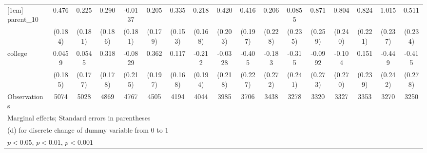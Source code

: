 {\begin{tabular}{l*{16}{c}}
[1em]
parent\_10           &       0.476\sym{**} &       0.225         &       0.290         &     -0.0137         &       0.205         &       0.335\sym{*}  &       0.218         &       0.420\sym{*}  &       0.416\sym{*}  &       0.206         &      0.0855         &       0.871\sym{***}&       0.804\sym{***}&       0.824\sym{***}&       1.015\sym{***}&       0.511\sym{*}  \\
                    &     (0.184)         &     (0.181)         &     (0.186)         &     (0.181)         &     (0.179)         &     (0.153)         &     (0.168)         &     (0.203)         &     (0.197)         &     (0.228)         &     (0.235)         &     (0.259)         &     (0.240)         &     (0.221)         &     (0.237)         &     (0.234)         \\
[1em]
college             &      0.0459         &      0.0545         &       0.318         &     -0.0829         &       0.362         &       0.117         &      -0.212         &     -0.0328         &      -0.405         &      -0.183         &      -0.315         &     -0.0992         &      -0.104         &       0.151         &      -0.449         &      -0.415         \\
                    &     (0.185)         &     (0.177)         &     (0.178)         &     (0.215)         &     (0.197)         &     (0.168)         &     (0.194)         &     (0.218)         &     (0.227)         &     (0.272)         &     (0.241)         &     (0.273)         &     (0.270)         &     (0.239)         &     (0.242)         &     (0.278)         \\
\hline
Observations        &        5074         &        5028         &        4869         &        4767         &        4505         &        4194         &        4044         &        3985         &        3706         &        3438         &        3278         &        3320         &        3327         &        3353         &        3270         &        3250         \\
\hline\hline
\multicolumn{17}{l}{\footnotesize Marginal effects; Standard errors in parentheses}\\
\multicolumn{17}{l}{\footnotesize  (d) for discrete change of dummy variable from 0 to 1}\\
\multicolumn{17}{l}{\footnotesize \sym{*} \(p<0.05\), \sym{**} \(p<0.01\), \sym{***} \(p<0.001\)}\\
\end{tabular}
}
